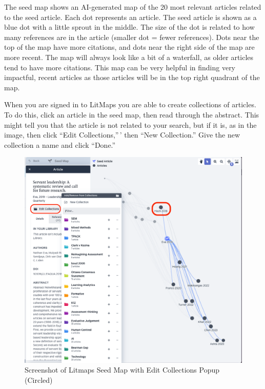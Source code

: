 \documentclass[
  letterpaper,
  DIV=11,
  numbers=noendperiod]{scrreprt}
\begin{document}
The seed map shows an AI-generated map of the 20 most relevant articles
related to the seed article. Each dot represents an article. The seed
article is shown as a blue dot with a little sprout in the middle. The
size of the dot is related to how many references are in the article
(smaller dot = fewer references). Dots near the top of the map have more
citations, and dots near the right side of the map are more recent. The
map will always look like a bit of a waterfall, as older articles tend
to have more citations. This map can be very helpful in finding very
impactful, recent articles as those articles will be in the top right
quadrant of the map.

When you are signed in to LitMaps you are able to create collections of
articles. To do this, click an article in the seed map, then read
through the abstract. This might tell you that the article is not
related to your search, but if it is, as in the image, then click ``Edit
Collections,''\,' then ``New Collection.'' Give the new collection a
name and click ``Done.''

\begin{figure}

\caption{\label{fig-litmaps3}Screenshot of Litmaps Seed Map with Edit
Collections Popup (Circled)}

\includegraphics{assets/u2/litmaps3.png}

\end{figure}%
\end{document}
